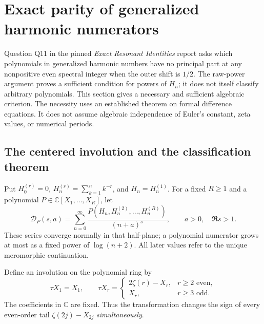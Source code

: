 \section{Exact parity of generalized harmonic numerators}
\label{ghp:sec}

Question Q11 in the pinned \emph{Exact Resonant Identities} report
\cite{ghp:ExactResonant} asks which polynomials in generalized harmonic
numbers have no principal part at any nonpositive even spectral integer
when the outer shift is $1/2$. The raw-power argument proves a sufficient
condition for powers of $H_n$; it does not itself classify arbitrary
polynomials. This section gives a necessary and sufficient algebraic
criterion. The necessity uses an established theorem on formal
difference equations. It does not assume algebraic independence of
Euler's constant, zeta values, or numerical periods.

\subsection{The centered involution and the classification theorem}

Put $H_0^{(r)}=0$, $H_n^{(r)}=\sum_{k=1}^n k^{-r}$, and $H_n=H_n^{(1)}$.
For a fixed $R\geq1$ and a polynomial $P\in\mathbb C[X_1,\ldots,X_R]$,
let
\begin{equation}\label{ghp:def:series}
 \mathcal D_P(s,a)=\sum_{n=0}^{\infty}
  \frac{P(H_n,H_n^{(2)},\ldots,H_n^{(R)})}{(n+a)^s},
 \qquad a>0,\quad \Re s>1.
\end{equation}
These series converge normally in that half-plane; a polynomial
numerator grows at most as a fixed power of $\log(n+2)$.
All later values refer to the unique meromorphic continuation.

Define an involution on the polynomial ring by
\begin{equation}\label{ghp:def:tau}
 \tau X_1=X_1,\qquad
 \tau X_r=\begin{cases}
       2\zeta(r)-X_r,&r\geq2\text{ even},\\
       X_r,&r\geq3\text{ odd}.
       \end{cases}
\end{equation}
The coefficients in $\mathbb C$ are fixed. Thus the transformation
changes the sign of every even-order tail $\zeta(2j)-X_{2j}$
\emph{simultaneously}.

